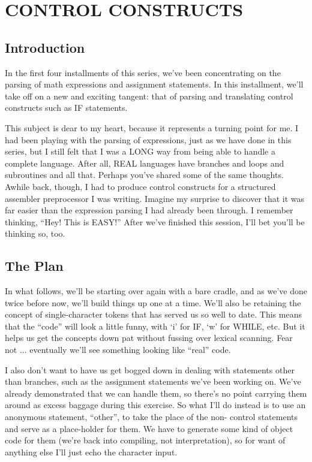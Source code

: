 
\chapter{CONTROL CONSTRUCTS}

\section{Introduction}

In  the  first  four  installments  of  this  series, we've  been concentrating on the parsing of math  expressions  and assignment statements. In  this  installment, we'll  take off on a new and exciting  tangent:  that   of  parsing  and  translating  control constructs such as IF statements.

This subject is dear to my heart, because it represents a turning point  for  me. I  had  been  playing  with  the   parsing  of expressions, just as  we  have  done  in this series, but I still felt that I was a LONG way from being able  to  handle a complete language. After all, REAL  languages have branches and loops and subroutines and all that. Perhaps you've shared some of the same thoughts. Awhile  back, though, I  had  to  produce  control constructs for a structured assembler preprocessor I was writing. Imagine my surprise to  discover  that it was far easier than the expression  parsing  I  had  already  been through. I  remember thinking, ``Hey! This is EASY!'' After we've finished this session, I'll bet you'll be thinking so, too.

\section{The Plan}

In what follows, we'll be starting over again with a bare cradle, and as we've done twice before now, we'll build things up  one at a time. We'll also  be retaining the concept of single-character tokens that has served us so well to date. This  means that the ``code'' will look a little funny, with `i' for IF, `w'  for WHILE, etc. But it helps us  get  the concepts down pat without fussing over  lexical  scanning. Fear  not  ... eventually we'll  see something looking like ``real'' code.

I also don't  want  to  have  us  get bogged down in dealing with statements other than branches, such as the assignment statements we've  been  working  on. We've already demonstrated that we can handle them, so there's no point carrying them  around  as excess baggage during this exercise. So what I'll do instead is  to use an  anonymous  statement, ``other'', to take the place of the non- control statements and serve as a place-holder for them. We have to generate some kind of object code for them  (we're  back  into compiling, not interpretation), so for want of anything else I'll just echo the character input.

